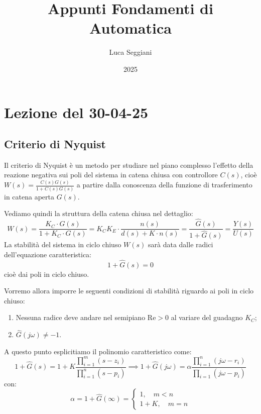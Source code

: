 \documentclass[a4paper,11pt]{article}
\title{Appunti Fondamenti di Automatica}
\author{Luca Seggiani}
\date{2025}
\begin{document}
\section{Lezione del 30-04-25}

\thispagestyle{empty}
\pagestyle{fancy}

\subsection{Criterio di Nyquist}
Il criterio di Nyquist è un metodo per studiare nel piano complesso l'effetto della reazione negativa sui poli del sistema in catena chiusa con controllore $C(s)$, cioè $W(s) = \frac{C(s)G(s)}{1 + C(s)G(s)}$ a partire dalla conoscenza della funzione di trasferimento in catena aperta $G(s)$.

Vediamo quindi la struttura della catena chiusa nel dettaglio:
$$
W(s) = \frac{K_C \cdot G(s)}{1 + K_C \cdot G(s)} = K_C K_E \cdot \frac{n(s)}{d(s) + K \cdot n(s)} = \frac{\hat{G}(s)}{1 + \hat{G}(s)} = \frac{Y(s)}{U(s)}
$$
La stabilità del sistema in ciclo chiuso $W(s)$ sarà data dalle radici dell'equazione caratteristica:
$$
1 + \hat{G}(s) = 0
$$
cioè dai poli in ciclo chiuso.

Vorremo allora imporre le seguenti condizioni di stabilità riguardo ai poli in ciclo chiuso:
\begin{enumerate}
	\item Nessuna radice deve andare nel semipiano $\mathrm{Re} > 0$ al variare del guadagno $K_C$;
	\item $\hat{G}(j \omega) \neq -1$.
\end{enumerate}

A questo punto esplicitiamo il polinomio caratteristico come:
$$
1 + \hat{G}(s) = 1 + K \frac{ \prod_{i = 1}^m (s - z_i) }{ \prod_{i = 1}^n (s - p_i) } \implies 1 + \hat{G}(j \omega) = \alpha \frac{ \prod_{i = 1}^n (j \omega - r_i) }{ \prod_{i = 1}(j \omega - p_i) }
$$
con:
\[
	\alpha = 1 + \hat{G}(\infty) =			
	\begin{cases}
		1, \quad m < n \\
		1 + K, \quad m = n
	\end{cases}
\]
\end{document}
